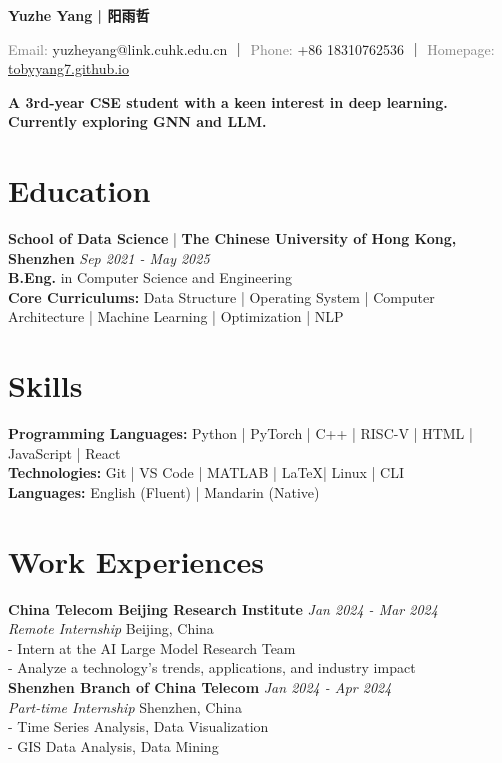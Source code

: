 \documentclass[a4paper,10pt]{article}
\newcommand{\contact}[2]{\noindent\textcolor{gray}{#1:} #2}
\begin{document}
\newcommand{\name}[1]{\noindent\textbf{\LARGE #1}\vspace{0.5em}}

\begin{center}
    
\name{Yuzhe Yang | 阳雨哲}

\contact{Email}{yuzheyang@link.cuhk.edu.cn} ｜ \contact{Phone}{+86 18310762536} ｜ \contact{Homepage}{\href{https://tobyyang7.github.io/}{tobyyang7.github.io}}

\vspace*{.2em}
\textbf{A 3rd-year CSE student with a keen interest in deep learning. Currently exploring GNN and LLM.\\}

\end{center}

\section*{Education}
\textbf{School of Data Science} | \textbf{The Chinese University of Hong Kong, Shenzhen} \hfill \textit{Sep 2021 - May 2025}\\
\textbf{B.Eng.} in Computer Science and Engineering\\
\textbf{Core Curriculums:}
Data Structure | Operating System |  Computer Architecture |  Machine Learning | Optimization |  NLP


\section*{Skills}
\textbf{Programming Languages:} Python | PyTorch | C++ | RISC-V | HTML | JavaScript |  React\\
\textbf{Technologies:} Git | VS Code | MATLAB | \LaTeX | Linux | CLI\\
\textbf{Languages:} English (Fluent) | Mandarin (Native)

\section*{Work Experiences}
\textbf{China Telecom Beijing Research Institute} \hfill \textit{Jan 2024 - Mar 2024}\\
\textit{Remote Internship} \hfill Beijing, China\\
- Intern at the AI Large Model Research Team\\
- Analyze a technology's trends, applications, and industry impact\\
\textbf{Shenzhen Branch of China Telecom} \hfill \textit{Jan 2024 - Apr 2024}\\
\textit{Part-time Internship} \hfill Shenzhen, China\\
- Time Series Analysis, Data Visualization\\
- GIS Data Analysis, Data Mining
\end{document}
